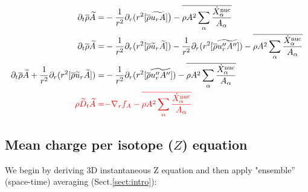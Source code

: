 \documentclass[10pt,paper=a4]{report}
\newcommand{\eht}{\overline}
\newcommand{\fht}{\widetilde}
\begin{document}
\begin{align}
\partial_t \overline{\rho} \fht{A} = & -\frac{1}{r^{2}} \partial_{r}(r^{2} [\eht{\rho} \fht{u_{r} A}] \big) - \eht{\rho A^2 \sum_\alpha \frac{\dot{X}_\alpha^{\rm nuc}}{A_\alpha}} \\
\partial_t \overline{\rho} \fht{A} = & -\frac{1}{r^{2}} \partial_{r}(r^{2} [\eht{\rho} \fht{u}_{r} \fht{A}])  -\frac{1}{r^{2}} \partial_{r}(r^{2} [\eht{\rho} \fht{u''_r A''}]) - \eht{\rho A^2 \sum_\alpha \frac{\dot{X}_\alpha^{\rm nuc}}{A_\alpha}} \\
\partial_t \overline{\rho} \fht{A} + \frac{1}{r^{2}} \partial_{r}(r^{2} [\eht{\rho} \fht{u}_{r} \fht{A}]) = &   -\frac{1}{r^{2}} \partial_{r}(r^{2} [\eht{\rho} \fht{u''_r A''}]) - \eht{\rho A^2 \sum_\alpha \frac{\dot{X}_\alpha^{\rm nuc}}{A_\alpha}} \\
{\color{red} \rho \fht{D}_t\fht{A} =} & {\color{red} -\nabla_r f_A - \eht{\rho A^2 \sum_\alpha \frac{\dot{X}_\alpha^{\rm nuc}}{A_\alpha}}}
\end{align}

\fontsize{12pt}{20pt}

\newpage

\subsection{Mean charge per isotope ($Z$) equation}

We begin by deriving 3D instantaneous Z equation and then apply "ensemble'' (space-time) averaging (Sect.\ref{sect:intro}):

\fontsize{9pt}{20pt}
\end{document}
